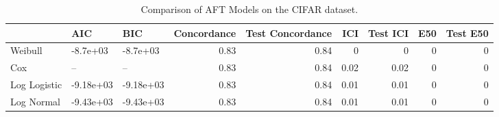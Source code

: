 \begin{table*}
\centering
\caption{Comparison of AFT Models on the CIFAR dataset.}
\label{tab:cifar}
\begin{tabular}{lllrrrrrr}
\toprule
 & AIC & BIC & Concordance & Test Concordance & ICI & Test ICI & E50 & Test E50 \\
\midrule
Weibull & -8.7e+03 & -8.7e+03 & 0.83 & 0.84 & 0 & 0 & 0 & 0 \\
Cox & -- & -- & 0.83 & 0.84 & 0.02 & 0.02 & 0 & 0 \\
Log Logistic & -9.18e+03 & -9.18e+03 & 0.83 & 0.84 & 0.01 & 0.01 & 0 & 0 \\
Log Normal & -9.43e+03 & -9.43e+03 & 0.83 & 0.84 & 0.01 & 0.01 & 0 & 0 \\
\bottomrule
\end{tabular}
\end{table*}
